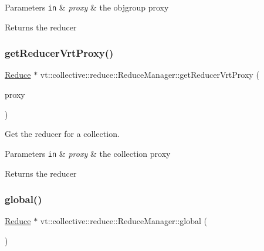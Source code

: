 \begin{DoxyParams}[1]{Parameters}
\mbox{\tt in}  & {\em proxy} & the objgroup proxy\\
\hline
\end{DoxyParams}
\begin{DoxyReturn}{Returns}
the reducer 
\end{DoxyReturn}
\mbox{\label{structvt_1_1collective_1_1reduce_1_1_reduce_manager_aa6a24ee9cccbc984031bc834471429a9}} 
\subsubsection{\texorpdfstring{get\+Reducer\+Vrt\+Proxy()}{getReducerVrtProxy()}}
{\footnotesize\ttfamily \hyperlink{structvt_1_1collective_1_1reduce_1_1_reduce}{Reduce} $\ast$ vt\+::collective\+::reduce\+::\+Reduce\+Manager\+::get\+Reducer\+Vrt\+Proxy (\begin{DoxyParamCaption}\item[{\hyperlink{namespacevt_a1b417dd5d684f045bb58a0ede70045ac}{Virtual\+Proxy\+Type} const \&}]{proxy }\end{DoxyParamCaption})}



Get the reducer for a collection. 


\begin{DoxyParams}[1]{Parameters}
\mbox{\tt in}  & {\em proxy} & the collection proxy\\
\hline
\end{DoxyParams}
\begin{DoxyReturn}{Returns}
the reducer 
\end{DoxyReturn}
\mbox{\label{structvt_1_1collective_1_1reduce_1_1_reduce_manager_afa3c814ff0e1c7ef1a9f76ed4036512b}} 
\subsubsection{\texorpdfstring{global()}{global()}}
{\footnotesize\ttfamily \hyperlink{structvt_1_1collective_1_1reduce_1_1_reduce}{Reduce} $\ast$ vt\+::collective\+::reduce\+::\+Reduce\+Manager\+::global (\begin{DoxyParamCaption}{ }\end{DoxyParamCaption})}



